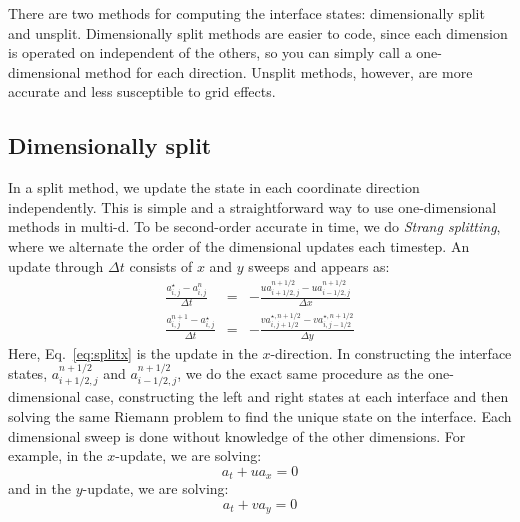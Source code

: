 \documentclass[11pt]{article}
\begin{document}
There are two methods for computing the interface states:
dimensionally split and unsplit.  Dimensionally split methods are
easier to code, since each dimension is operated on independent of the
others, so you can simply call a one-dimensional method for each
direction.  Unsplit methods, however, are more accurate and less
susceptible to grid effects.

\subsection{Dimensionally split}

In a split method, we update the
state in each coordinate direction independently.  This is simple and
a straightforward way to use one-dimensional methods in multi-d.  To
be second-order accurate in time, we do {\em Strang splitting}, where
we alternate the order of the dimensional updates each timestep.  An update
through $\Delta t$ consists of $x$ and $y$ sweeps and appears as:
\begin{eqnarray}
 \frac{a_{i,j}^\star - a_{i,j}^n}{\Delta t} &=&
  - \frac{ u a_{i+1/2,j}^{n+1/2} - u a_{i-1/2,j}^{n+1/2} }{\Delta x} \label{eq:splitx}\\
 \frac{a_{i,j}^{n+1} - a_{i,j}^\star}{\Delta t} &=&
  - \frac{ v a_{i,j+1/2}^{\star,n+1/2} - v a_{i,j-1/2}^{\star,n+1/2} }{\Delta y} \label{eq:splity}
\end{eqnarray}
Here, Eq.~\ref{eq:splitx} is the update in the $x$-direction.  In
constructing the interface states, $a_{i+1/2,j}^{n+1/2}$ and
$a_{i-1/2,j}^{n+1/2}$, we do the exact same procedure as the
one-dimensional case, constructing the left and right states at each
interface and then solving the same Riemann problem to find the unique
state on the interface.  Each dimensional sweep is done without
knowledge of the other dimensions.  For example, in the $x$-update, we
are solving:
\begin{equation}
a_t + u a_x = 0
\label{eq:advect1dx}
\end{equation}
and in the $y$-update, we are solving:
\begin{equation}
a_t + v a_y = 0
\end{equation}
\end{document}

